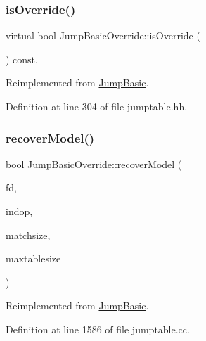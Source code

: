 \subsubsection{\texorpdfstring{isOverride()}{isOverride()}}
{\footnotesize\ttfamily virtual bool Jump\+Basic\+Override\+::is\+Override (\begin{DoxyParamCaption}\item[{void}]{ }\end{DoxyParamCaption}) const\hspace{0.3cm}{\ttfamily [inline]}, {\ttfamily [virtual]}}



Reimplemented from \mbox{\hyperlink{class_jump_basic_a9f923a2aaeb571981a8ae758670d20f5}{Jump\+Basic}}.



Definition at line 304 of file jumptable.\+hh.

\mbox{\label{class_jump_basic_override_a4fd706bf7ee1023bd1d93c78ba66852f}} 
\subsubsection{\texorpdfstring{recoverModel()}{recoverModel()}}
{\footnotesize\ttfamily bool Jump\+Basic\+Override\+::recover\+Model (\begin{DoxyParamCaption}\item[{\mbox{\hyperlink{class_funcdata}{Funcdata}} $\ast$}]{fd,  }\item[{\mbox{\hyperlink{class_pcode_op}{Pcode\+Op}} $\ast$}]{indop,  }\item[{uint4}]{matchsize,  }\item[{uint4}]{maxtablesize }\end{DoxyParamCaption})\hspace{0.3cm}{\ttfamily [virtual]}}



Reimplemented from \mbox{\hyperlink{class_jump_basic_aebf055ad4baf1a138107d8dd3a40c809}{Jump\+Basic}}.



Definition at line 1586 of file jumptable.\+cc.

